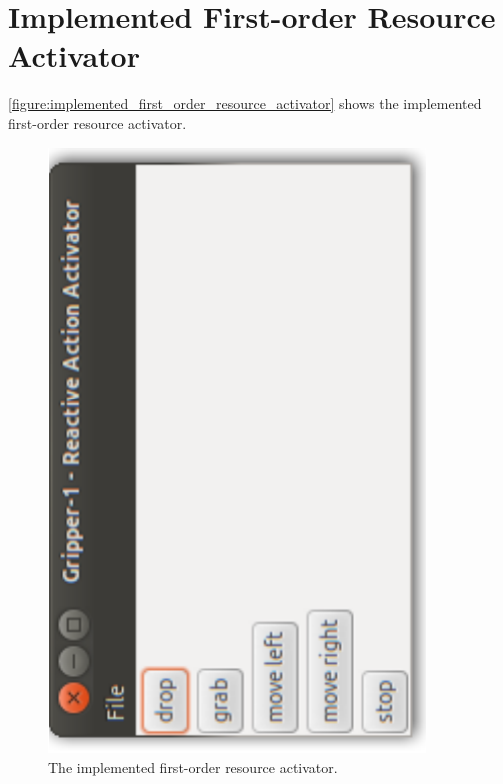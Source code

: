 \section{Implemented First-order Resource Activator}

{\mbox{\autoref{figure:implemented_first_order_resource_activator}}}
shows the implemented first-order resource activator.
\begin{figure}
\includegraphics[width=10cm]{gfx/implemented_first_order_resource_activator}
\caption[The implemented first-order resource activator.]{The
  implemented first-order resource activator.}
\label{figure:implemented_first_order_resource_activator}
\end{figure}

